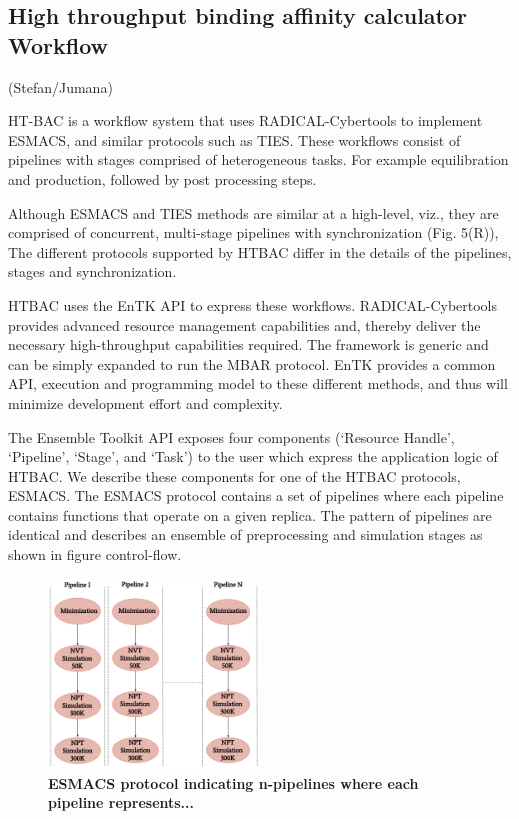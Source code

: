 \subsection{High throughput binding affinity calculator Workflow}

(Stefan/Jumana)


HT-BAC is a workflow system that uses RADICAL-Cybertools to implement ESMACS,
and similar protocols such as TIES. These workflows consist of pipelines with
stages comprised of heterogeneous tasks. For example equilibration and
production, followed by post processing steps. 

Although ESMACS and TIES methods are similar at a high-level, viz., they are
comprised of concurrent, multi-stage pipelines with synchronization (Fig.
5(R)), The different protocols supported by HTBAC differ in the details of the
pipelines, stages and synchronization.

HTBAC uses the EnTK API to express these workflows. RADICAL-Cybertools
provides advanced resource management capabilities and, thereby deliver the
necessary high-throughput capabilities required. The framework is generic and
can be simply expanded to run the MBAR protocol. EnTK provides a common API,
execution and programming model to these different methods, and thus will
minimize development effort and complexity.

The Ensemble Toolkit API exposes four components (‘Resource
Handle’, ‘Pipeline’, ‘Stage’, and ‘Task') to the user which express the
application logic of HTBAC. We describe these components for one of the HTBAC
protocols, ESMACS. The ESMACS protocol contains a set of pipelines where each
pipeline contains functions that operate on a given replica. The pattern of
pipelines are identical and describes an ensemble of preprocessing and
simulation stages as shown in figure control-flow.



\begin{figure}[tb]
\centering
  \includegraphics[width=0.5\textwidth]{FIGURES/HT-BAC-NAMD-pipelines-control-flow-only.pdf}
  \caption{\bf ESMACS protocol indicating n-pipelines where each pipeline represents...}
   \label{figure:ESMACS-pipelines}
\end{figure}

